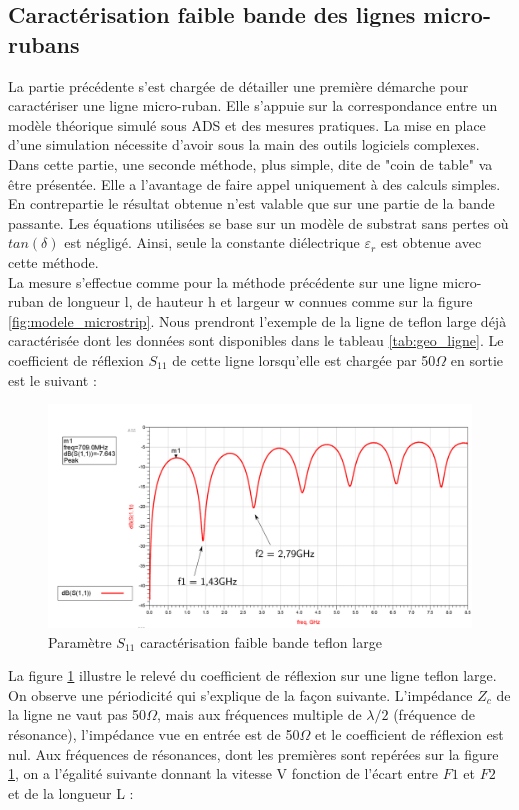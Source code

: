 \documentclass[french]{article}
\begin{document}
\subsection{Caractérisation faible bande des lignes micro-rubans}
La partie précédente s'est chargée de détailler une première démarche pour caractériser une ligne micro-ruban. Elle s'appuie sur la correspondance entre un modèle théorique simulé sous ADS et des mesures pratiques. La mise en place d'une simulation nécessite d'avoir sous la main des outils logiciels complexes. Dans cette partie, une seconde méthode, plus simple, dite de "coin de table" va être présentée. Elle a l'avantage de faire appel uniquement à des calculs simples. En contrepartie le résultat obtenue n'est valable que sur une partie de la bande passante. Les équations utilisées se base sur un modèle de substrat sans pertes où $tan( \delta)$ est négligé. Ainsi, seule la constante diélectrique $\varepsilon_r$ est obtenue avec cette méthode. \\
La mesure s'effectue comme pour la méthode précédente sur une ligne micro-ruban de longueur l, de hauteur h et largeur w connues comme sur la figure \ref{fig:modele_microstrip}. Nous prendront l'exemple de la ligne de teflon large déjà caractérisée dont les données sont disponibles dans le tableau \ref{tab:geo_ligne}. Le coefficient de réflexion $S_{11}$ de cette ligne lorsqu’elle est chargée par 50$\Omega$ en sortie est le suivant :
\begin{figure}[H]
	\centering
	\includegraphics[width=0.7\linewidth]{../2carac/S11_ADS/teflonLarge_commente}
	\caption{Paramètre $S_{11}$ caractérisation faible bande teflon large}
	\label{fig:teflonlargecommente}
\end{figure}
La figure \ref{fig:teflonlargecommente} illustre le relevé du coefficient de réflexion sur une ligne teflon large. On observe une périodicité qui s'explique de la façon suivante. L'impédance $Z_c$ de la ligne ne vaut pas 50$\Omega$, mais aux fréquences multiple de $\lambda /2$ (fréquence de résonance), l'impédance vue en entrée est de 50$\Omega$ et le coefficient de réflexion est nul. Aux fréquences de résonances, dont les premières sont repérées sur la figure \ref{fig:teflonlargecommente}, on a l'égalité suivante donnant la vitesse V fonction de l'écart entre $F1$ et $F2$ et de la longueur L :  
\end{document}
